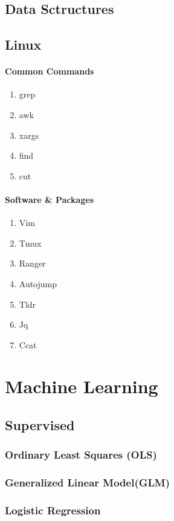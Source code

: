 \documentclass[11pt]{article}
\begin{document}
\subsection{Data Sctructures}

\subsection{Linux}

\paragraph{Common Commands}
\begin{enumerate}
  \item grep
  \item awk
  \item xargs
  \item find
  \item cut
\end{enumerate}

\paragraph{Software \& Packages}
\begin{enumerate}
  \item Vim
  \item Tmux
  \item Ranger
  \item Autojump
  \item Tldr
  \item Jq
  \item Ccat
\end{enumerate}

\section{Machine Learning}
\subsection{Supervised}
\subsubsection{Ordinary Least Squares (OLS)}
\subsubsection{Generalized Linear Model(GLM)}
\subsubsection{Logistic Regression}
\end{document}
